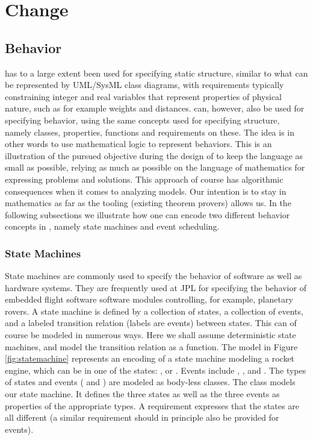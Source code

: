 \section{Change}
\label{sec:change}

\subsection{Behavior}

\Klang{} has to a large extent been used for specifying static structure, similar
to what can be represented by UML/SysML class diagrams, with requirements
typically constraining integer and real variables that represent properties of physical nature, such as for example weights and distances.
\Klang{} can, however, also be used for specifying behavior, using the same
concepts used for specifying structure, namely classes, properties, functions and
requirements on these. The idea is in other words to use mathematical logic to represent behaviors. This is an illustration of the pursued objective during 
the design of \Klang{} to keep the language as small as possible, relying as much as possible on the language of mathematics for expressing problems and solutions. 
This approach of course has algorithmic consequences when it comes to analyzing models. Our intention is to stay in mathematics as far as the tooling (existing theorem provers) allows us. In the following subsections we illustrate how one can encode two different behavior concepts in \Klang{}, namely state machines and event scheduling.

\subsubsection{State Machines}

State machines are commonly used to specify the behavior of software as well as hardware systems. They are frequently used at JPL for specifying the behavior of
embedded flight software software modules controlling, for example, planetary rovers. A state machine is defined by a collection of states,
a collection of events, and a labeled transition relation (labels are events) between states. This can of course be modeled in numerous ways. Here we shall assume deterministic state machines, and model the transition relation as a function. 
The \Klang{} model in Figure \ref{fig:statemachine} represents an encoding of a state machine modeling a rocket engine, which can be in one of the states:  ,  or . Events include , , and . The types of states and events ( and ) are modeled as body-less classes. The class 
models our state machine. It defines the three states as well as the 
three events as properties of the appropriate types. A requirement expresses that the states are all different (a similar requirement should in principle also be provided for events).

